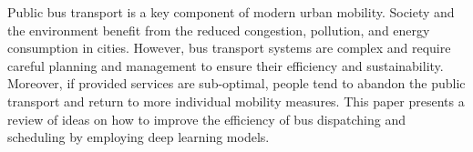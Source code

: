 Public bus transport is a key component of modern urban mobility. Society and the environment
benefit from the reduced congestion, pollution, and energy consumption in cities. However,
bus transport systems are complex and require careful planning and management to
ensure their efficiency and sustainability. Moreover, if provided services are sub-optimal,
people tend to abandon the public transport and return to more individual mobility measures.
This paper presents a review of ideas on how to improve the efficiency of 
bus dispatching and scheduling by employing deep learning models. 